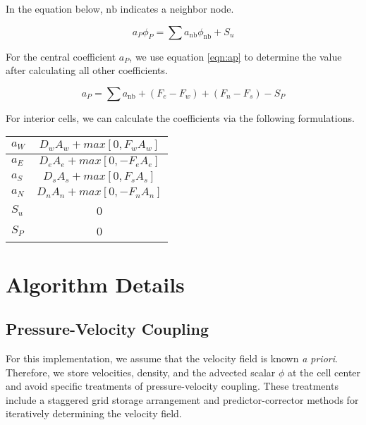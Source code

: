 \documentclass{article}
\newcommand{\DA}[1]{D_{#1} A_{#1}}
\newcommand{\FA}[1]{F_{#1} A_{#1}}
\newcommand{\lp}{\left(}
\newcommand{\rp}{\right)}
\begin{document}
In the equation below, $\mathrm{nb}$ indicates a neighbor node. 

\begin{equation}
   a_P \phi_P = \sum a_{\mathrm{nb}} \phi_{\mathrm{nb}} + S_u
\end{equation}

For the central coefficient $a_P$, we use equation \ref{eqn:ap} to determine the value after calculating all other coefficients.

\begin{equation}
   a_P = \sum a_{\mathrm{nb}} + \lp F_e - F_w \rp + \lp F_n - F_s \rp - S_P
   \label{eqn:ap}
\end{equation}

For interior cells, we can calculate the coefficients via the following formulations.
\begin{table}[!ht]
\centering
\begin{tabular}{|l|c|} \hline
   $a_W$ & $\DA{w} + max\left[0,  \FA{w}\right]$ \\ \hline
   $a_E$ & $\DA{e} + max\left[0, -\FA{e}\right]$ \\ \hline
   $a_S$ & $\DA{s} + max\left[0,  \FA{s}\right]$ \\ \hline
   $a_N$ & $D_n A_n + max\left[0, -F_n A_n\right]$ \\ \hline
   $S_u$ & 0 \\ \hline
   $S_P$ & 0 \\ \hline
\end{tabular}
\end{table}


\section{Algorithm Details}

\subsection{Pressure-Velocity Coupling}
For this implementation, we assume that the velocity field is known \textit{a priori}. Therefore, we store velocities, density, and the advected scalar $\phi$ at the cell center and avoid specific treatments of pressure-velocity coupling. These treatments include a staggered grid storage arrangement and predictor-corrector methods for iteratively determining the velocity field.
\end{document}

